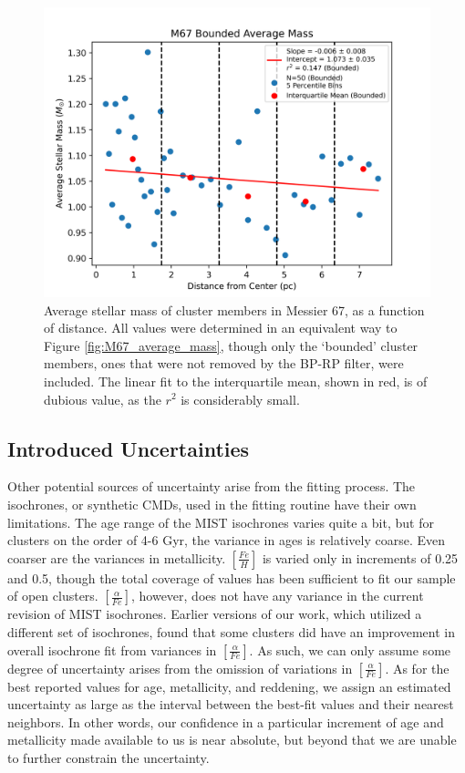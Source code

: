 \documentclass[onecolumn,table,xcdraw,super]{aastex631}
\begin{document}
\begin{figure}[]
    \centering
      \includegraphics[width=4.75in]{figures/M67_averageMass_bounded.png}
    \caption{Average stellar mass of cluster members in Messier 67, as a function of distance. All values were determined in an equivalent way to Figure \ref{fig:M67_average_mass}, though only the `bounded' cluster members, ones that were not removed by the BP-RP filter, were included. The linear fit to the interquartile mean, shown in red, is of dubious value, as the $r^2$ is considerably small.}
    \label{fig:M67_average_mass_bounded}
\end{figure}


\subsection{Introduced Uncertainties} \label{sec:uncertainty}

Other potential sources of uncertainty arise from the fitting process. The isochrones, or synthetic CMDs, used in the fitting routine have their own limitations. The age range of the MIST isochrones varies quite a bit, but for clusters on the order of 4-6 Gyr, the variance in ages is relatively coarse. Even coarser are the variances in metallicity. $[\frac{Fe}{H}]$ is varied only in increments of 0.25 and 0.5, though the total coverage of values has been sufficient to fit our sample of open clusters. $[\frac{\alpha}{Fe}]$, however, does not have any variance in the current revision of MIST isochrones. Earlier versions of our work, which utilized a different set of isochrones, found that some clusters did have an improvement in overall isochrone fit from variances in $[\frac{\alpha}{Fe}]$. As such, we can only assume some degree of uncertainty arises from the omission of variations in $[\frac{\alpha}{Fe}]$. As for the best reported values for age, metallicity, and reddening, we assign an estimated uncertainty as large as the interval between the best-fit values and their nearest neighbors. In other words, our confidence in a particular increment of age and metallicity made available to us is near absolute, but beyond that we are unable to further constrain the uncertainty.
\end{document}
